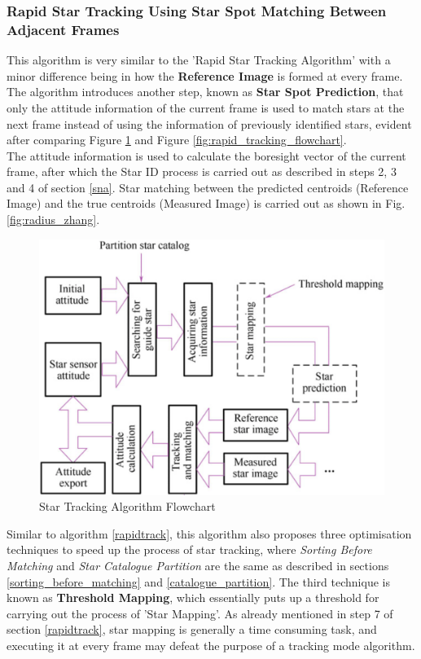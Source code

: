 \documentclass[../../main.tex]{subfiles}
\begin{document}
\subsubsection{Rapid Star Tracking Using Star Spot Matching Between Adjacent Frames} \label{zhang}
This algorithm is very similar to the 'Rapid Star Tracking Algorithm' with a minor difference being in how the \textbf{Reference Image} is formed at every frame. The algorithm introduces another step, known as \textbf{Star Spot Prediction},  that only the attitude information of the current frame is used to match stars at the next frame instead of using the information of previously identified stars, evident after comparing Figure \ref{fig:zhang_tracking_flowchart} and Figure \ref{fig:rapid_tracking_flowchart}. \\
The attitude information is used to calculate the boresight vector of the current frame, after which the Star ID process is carried out as described in steps 2, 3 and 4 of section \ref{sna}. 
Star matching between the predicted centroids (Reference Image) and the true centroids (Measured Image) is carried out as shown in Fig. \ref{fig:radius_zhang}. 
\begin{figure}[h]
        \centering
        \includegraphics[scale=0.35]{Figures/GNC/zhang_tracking_flowchart.png}
        \caption{Star Tracking Algorithm Flowchart}
        \label{fig:zhang_tracking_flowchart}
\end{figure}

Similar to algorithm \ref{rapidtrack}, this algorithm also proposes three optimisation techniques to speed up the process of star tracking, where \textit{Sorting Before Matching} and \textit{Star Catalogue Partition} are the same as described in sections \ref{sorting_before_matching} and \ref{catalogue_partition}. The third technique is known as \textbf{Threshold Mapping}, which essentially puts up a threshold for carrying out the process of 'Star Mapping'. As already mentioned in step 7 of section \ref{rapidtrack}, star mapping is generally a time consuming task, and executing it at every frame may defeat the purpose of a tracking mode algorithm. 
\end{document}
